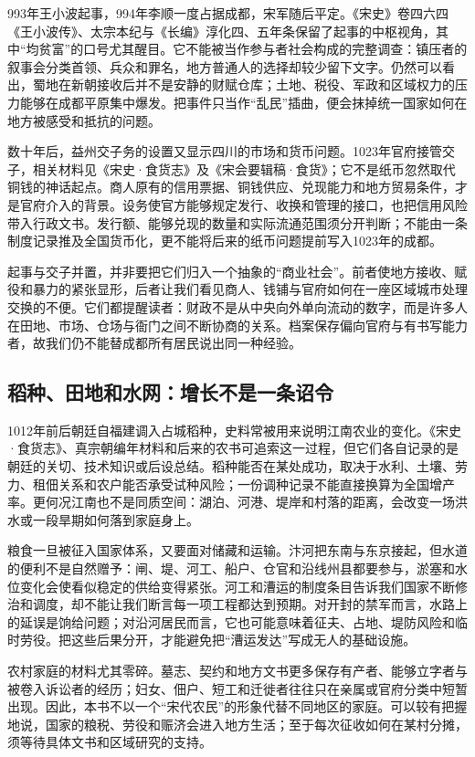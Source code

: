 993年王小波起事，994年李顺一度占据成都，宋军随后平定。《宋史》卷四六四《王小波传》、太宗本纪与《长编》淳化四、五年条保留了起事的中枢视角，其中“均贫富”的口号尤其醒目。它不能被当作参与者社会构成的完整调查：镇压者的叙事会分类首领、兵众和罪名，地方普通人的选择却较少留下文字。仍然可以看出，蜀地在新朝接收后并不是安静的财赋仓库；土地、税役、军政和区域权力的压力能够在成都平原集中爆发。把事件只当作“乱民”插曲，便会抹掉统一国家如何在地方被感受和抵抗的问题。

数十年后，益州交子务的设置又显示四川的市场和货币问题。1023年官府接管交子，相关材料见《宋史·食货志》及《宋会要辑稿·食货》；它不是纸币忽然取代铜钱的神话起点。商人原有的信用票据、铜钱供应、兑现能力和地方贸易条件，才是官府介入的背景。设务使官方能够规定发行、收换和管理的接口，也把信用风险带入行政文书。发行额、能够兑现的数量和实际流通范围须分开判断；不能由一条制度记录推及全国货币化，更不能将后来的纸币问题提前写入1023年的成都。

起事与交子并置，并非要把它们归入一个抽象的“商业社会”。前者使地方接收、赋役和暴力的紧张显形，后者让我们看见商人、钱铺与官府如何在一座区域城市处理交换的不便。它们都提醒读者：财政不是从中央向外单向流动的数字，而是许多人在田地、市场、仓场与衙门之间不断协商的关系。档案保存偏向官府与有书写能力者，故我们仍不能替成都所有居民说出同一种经验。

\subsection{稻种、田地和水网：增长不是一条诏令}

1012年前后朝廷自福建调入占城稻种，史料常被用来说明江南农业的变化。《宋史·食货志》、真宗朝编年材料和后来的农书可追索这一过程，但它们各自记录的是朝廷的关切、技术知识或后设总结。稻种能否在某处成功，取决于水利、土壤、劳力、租佃关系和农户能否承受试种风险；一份调种记录不能直接换算为全国增产率。更何况江南也不是同质空间：湖泊、河港、堤岸和村落的距离，会改变一场洪水或一段旱期如何落到家庭身上。

粮食一旦被征入国家体系，又要面对储藏和运输。汴河把东南与东京接起，但水道的便利不是自然赠予：闸、堤、河工、船户、仓官和沿线州县都要参与，淤塞和水位变化会使看似稳定的供给变得紧张。河工和漕运的制度条目告诉我们国家不断修治和调度，却不能让我们断言每一项工程都达到预期。对开封的禁军而言，水路上的延误是饷给问题；对沿河居民而言，它也可能意味着征夫、占地、堤防风险和临时劳役。把这些后果分开，才能避免把“漕运发达”写成无人的基础设施。

农村家庭的材料尤其零碎。墓志、契约和地方文书更多保存有产者、能够立字者与被卷入诉讼者的经历；妇女、佃户、短工和迁徙者往往只在亲属或官府分类中短暂出现。因此，本书不以一个“宋代农民”的形象代替不同地区的家庭。可以较有把握地说，国家的粮税、劳役和赈济会进入地方生活；至于每次征收如何在某村分摊，须等待具体文书和区域研究的支持。

